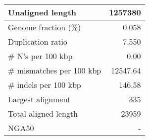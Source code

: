 \documentclass[12pt,a4paper]{article}
\begin{document}
\begin{table}[ht]
\begin{center}
\begin{tabular}{|l*{1}{|r}|}
Unaligned length & 1257380 \\ \hline
Genome fraction (\%) & 0.058 \\ \hline
Duplication ratio & 7.550 \\ \hline
\# N's per 100 kbp & 0.00 \\ \hline
\# mismatches per 100 kbp & 12547.64 \\ \hline
\# indels per 100 kbp & 146.58 \\ \hline
Largest alignment & 335 \\ \hline
Total aligned length & 23959 \\ \hline
NGA50 & - \\ \hline
\end{tabular}
\end{center}
\end{table}
\end{document}
